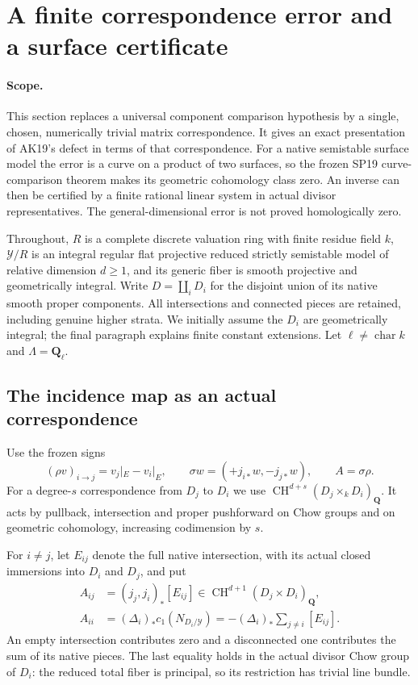 \section{A finite correspondence error and a surface certificate}
\label{r20pi:section}

\paragraph{Scope.}
This section replaces a universal component comparison hypothesis by a
single, chosen, numerically trivial matrix correspondence.  It gives an
exact presentation of AK19's defect in terms of that correspondence.
For a native semistable surface model the error is a curve on a product
of two surfaces, so the frozen SP19 curve-comparison theorem makes its
geometric cohomology class zero.  An inverse can then be certified by a
finite rational linear system in actual divisor representatives.
The general-dimensional error is not proved homologically zero.

Throughout, $R$ is a complete discrete valuation ring with finite residue
field $k$, $\mathcal Y/R$ is an integral regular flat projective reduced
strictly semistable model of relative dimension $d\ge1$, and its generic
fiber is smooth projective and geometrically integral.  Write
$D=\coprod_iD_i$ for the disjoint union of its native smooth proper
components.  All intersections and connected pieces are retained,
including genuine higher strata.  We initially assume the $D_i$ are
geometrically integral; the final paragraph explains finite constant
extensions.  Let $\ell\ne\operatorname{char}k$ and
$\Lambda=\mathbf Q_\ell$.

\subsection{The incidence map as an actual correspondence}

Use the frozen signs
\[
 (\rho v)_{i\to j}=v_j|_{E}-v_i|_{E},\qquad
 \sigma w=(+j_{i*}w,-j_{j*}w),\qquad A=\sigma\rho.
\]
For a degree-$s$ correspondence from $D_j$ to $D_i$ we use
$\operatorname{CH}^{d+s}(D_j\times_kD_i)_{\mathbf Q}$.
It acts by pullback, intersection and proper pushforward on Chow
groups and on geometric cohomology, increasing codimension by $s$.

For $i\ne j$, let $E_{ij}$ denote the full native intersection, with its
actual closed immersions into $D_i$ and $D_j$, and put
\[
 \begin{split}
 A_{ij}&=(j_{j},j_i)_*[E_{ij}]
        \in\operatorname{CH}^{d+1}(D_j\times D_i)_{\mathbf Q},\\
 A_{ii}&=(\Delta_i)_*c_1(N_{D_i/\mathcal Y})
       =-(\Delta_i)_*\sum_{j\ne i}[E_{ij}].
 \end{split}
 \tag{PI20.1}\label{r20pi:actualA}
\]
An empty intersection contributes zero and a disconnected one
contributes the sum of its native pieces.  The last equality holds
in the actual divisor Chow group of $D_i$: the reduced total fiber
is principal, so its restriction has trivial line bundle.

